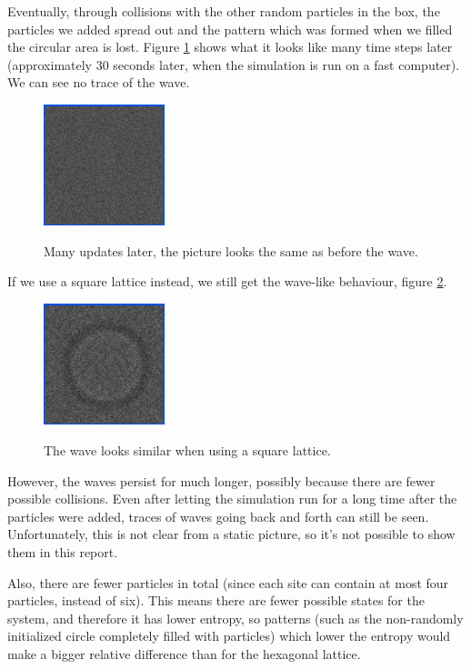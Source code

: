 \documentclass[12pt,a4paper]{article}
\begin{document}
Eventually, through collisions
with the other random particles in the box, the particles we added spread out and the pattern which was formed
when we filled the circular area is lost. Figure \ref{hexwaveend} shows what it looks like many time
steps later (approximately 30 seconds later, when the simulation is run on a fast computer).
We can see no trace of the wave.

\begin{figure}[htp]
\centering
  \includegraphics[width=100pt]{figs/hexwaveend.png}
\label{hexwaveend}
\caption{Many updates later, the picture looks the same as before the wave.}
\end{figure}



If we use a square lattice instead, we still get the wave-like behaviour, figure \ref{squarewave}.
\begin{figure}[htp]
\centering
  \includegraphics[width=100pt]{figs/squarewave.png}
\label{squarewave}
\caption{The wave looks similar when using a square lattice.}
\end{figure}

However, the waves persist for much longer, possibly because there are fewer possible collisions.
Even after letting the simulation run for a long time after the particles were added, traces of waves
going back and forth can still be seen. Unfortunately, this is not clear from a static picture, so
it's not possible to show them in this report.

Also, there are fewer particles in total (since each site can contain at most four particles, instead of six).
This means there are fewer possible states for the system, and therefore it has lower entropy, so patterns
(such as the non-randomly initialized circle completely filled with particles) which lower the entropy would make
a bigger relative difference than for the hexagonal lattice.
\end{document}
